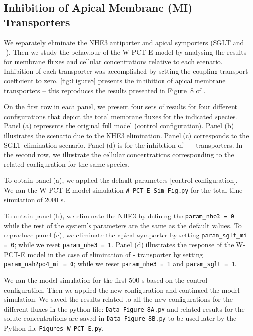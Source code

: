 \documentclass[fleqn,10pt]{physiome}
\begin{document}
\subsection{Inhibition of Apical Membrane (MI) Transporters}
\label{Apical Membrane Transporters}
We separately eliminate the NHE3 antiporter and apical symporters (SGLT and -). Then we study the behaviour of the W-PCT-E model by analysing the results for membrane fluxes and cellular concentrations relative to each scenario. Inhibition of each transporter was accomplished by setting the
coupling transport coefficient to zero. \autoref{fig:Figure8} presents the inhibition of apical membrane
transporters – this reproduces the results presented in Figure~8 of \cite{noroozbabaee2022modular}.

On the first row in each panel, we present four sets of results for four different configurations
that depict the total membrane fluxes for the indicated species.
Panel (a) represents the original
full model (control configuration). Panel (b) illustrates the scenario due to the NHE3 elimination. Panel (c) corresponds to the SGLT elimination scenario. Panel
(d) is for the inhibition of - – transporters. In the second row, we illustrate the cellular concentrations corresponding to the related configuration for the same species.

To obtain panel (a), we applied the default parameters [control configuration]. We ran the W-PCT-E model simulation \texttt{W\_PCT\_E\_Sim\_Fig.py} for the total time simulation of 2000 s.

To obtain panel (b), we eliminate the NHE3 by defining the \texttt{param\_nhe3 = 0} while the rest of the system's parameters are the same as the default values. To reproduce panel (c), we eliminate the apical symporter   by setting \texttt{param\_sglt\_mi = 0};
while we reset \texttt{param\_nhe3 = 1}.   Panel (d) illustrates the response of the W-PCT-E model in the case of elimination of - transporter by setting \texttt{param\_nah2po4\_mi = 0}; while we reset \texttt{param\_nhe3 = 1} and \texttt{param\_sglt = 1}. 

We ran the model simulation for the first 500 s based on the control configuration. Then we applied the new configuration and continued the model simulation. We saved the results related to all the new configurations for the different fluxes in the python file: \texttt{Data\_Figure\_8A.py} and related results for the solute concentrations are saved in \texttt{Data\_Figure\_8B.py} to be used later by the Python file \texttt{Figures\_W\_PCT\_E.py}.
\end{document}
